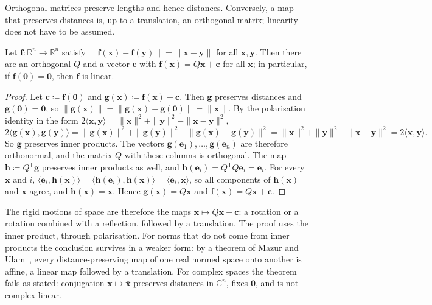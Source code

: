 Orthogonal matrices preserve lengths and hence distances. Conversely, a map that preserves distances is, up to a translation, an orthogonal matrix; linearity does not have to be assumed.

\begin{theorem}
\label{thm:isometries}
Let $\mathbf f\colon\mathbb R^n\to\mathbb R^n$ satisfy $\|\mathbf f(\mathbf x)-\mathbf f(\mathbf y)\|=\|\mathbf x-\mathbf y\|$ for all $\mathbf x,\mathbf y$. Then there are an orthogonal $Q$ and a vector $\mathbf c$ with $\mathbf f(\mathbf x)=Q\mathbf x+\mathbf c$ for all $\mathbf x$; in particular, if $\mathbf f(\mathbf 0)=\mathbf 0$, then $\mathbf f$ is linear.
\end{theorem}

\begin{proof}
Let $\mathbf c\coloneqq\mathbf f(\mathbf 0)$ and $\mathbf g(\mathbf x)\coloneqq\mathbf f(\mathbf x)-\mathbf c$. Then $\mathbf g$ preserves distances and $\mathbf g(\mathbf 0)=\mathbf 0$, so $\|\mathbf g(\mathbf x)\|=\|\mathbf g(\mathbf x)-\mathbf g(\mathbf 0)\|=\|\mathbf x\|$. By the polarisation identity in the form $2\langle\mathbf x,\mathbf y\rangle=\|\mathbf x\|^2+\|\mathbf y\|^2-\|\mathbf x-\mathbf y\|^2$,
\[
2\langle\mathbf g(\mathbf x),\mathbf g(\mathbf y)\rangle=\|\mathbf g(\mathbf x)\|^2+\|\mathbf g(\mathbf y)\|^2-\|\mathbf g(\mathbf x)-\mathbf g(\mathbf y)\|^2=\|\mathbf x\|^2+\|\mathbf y\|^2-\|\mathbf x-\mathbf y\|^2=2\langle\mathbf x,\mathbf y\rangle .
\]
So $\mathbf g$ preserves inner products. The vectors $\mathbf g(\mathbf e_1),\ldots,\mathbf g(\mathbf e_n)$ are therefore orthonormal, and the matrix $Q$ with these columns is orthogonal. The map $\mathbf h\coloneqq Q^{\mathsf T}\mathbf g$ preserves inner products as well, and $\mathbf h(\mathbf e_i)=Q^{\mathsf T}Q\mathbf e_i=\mathbf e_i$. For every $\mathbf x$ and $i$, $\langle\mathbf e_i,\mathbf h(\mathbf x)\rangle=\langle\mathbf h(\mathbf e_i),\mathbf h(\mathbf x)\rangle=\langle\mathbf e_i,\mathbf x\rangle$, so all components of $\mathbf h(\mathbf x)$ and $\mathbf x$ agree, and $\mathbf h(\mathbf x)=\mathbf x$. Hence $\mathbf g(\mathbf x)=Q\mathbf x$ and $\mathbf f(\mathbf x)=Q\mathbf x+\mathbf c$.
\end{proof}

The rigid motions of space are therefore the maps $\mathbf x\mapsto Q\mathbf x+\mathbf c$: a rotation or a rotation combined with a reflection, followed by a translation. The proof uses the inner product, through polarisation. For norms that do not come from inner products the conclusion survives in a weaker form: by a theorem of Mazur and Ulam~\cite{mazur1932}, every distance-preserving map of one real normed space onto another is affine, a linear map followed by a translation. For complex spaces the theorem fails as stated: conjugation $\mathbf x\mapsto\bar{\mathbf x}$ preserves distances in $\mathbb C^n$, fixes $\mathbf 0$, and is not complex linear.


